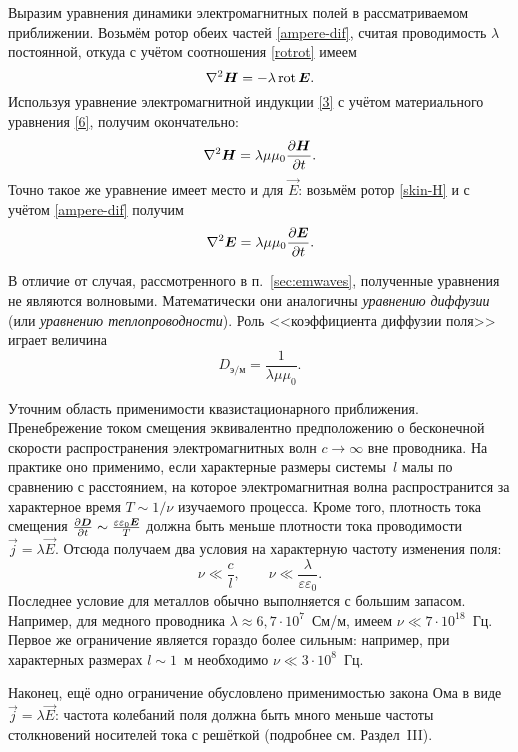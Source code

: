 Выразим уравнения динамики электромагнитных полей в рассматриваемом приближении.
Возьмём ротор обеих частей \eqref{ampere-dif}, считая проводимость $\lambda$ 
постоянной, откуда с учётом соотношения \eqref{rotrot} имеем
\begin{equation*} \eqmark{8}
\nabla^2\vec{H}= -\lambda \Rot \vec{E}.
\end{equation*}
Используя уравнение электромагнитной индукции \eqref{3} с учётом материального 
уравнения \eqref{6}, получим окончательно:
\begin{equation}\eqmark{skin-H}
\nabla^2\vec{H}= \lambda\mu\mu_0 \ddt{\vec{H}}.
\end{equation}
Точно такое же уравнение имеет место и для $\vec{E}$:
возьмём ротор \eqref{skin-H} и с учётом \eqref{ampere-dif} получим
\begin{equation}\eqmark{skin-E}
\nabla^2\vec{E}= \lambda\mu\mu_0 \ddt{\vec{E}}.
\end{equation}

В отличие от случая, рассмотренного в п.~\ref{sec:emwaves}, 
полученные уравнения не являются волновыми. Математически они аналогичны
\emph{уравнению диффузии} (или \emph{уравнению теплопроводности}). Роль 
<<коэффициента диффузии поля>> играет величина
\begin{equation}
D_{э/м} = \frac{1}{\lambda \mu \mu_0}.
\end{equation}

\begin{lab:note}
    Уточним область применимости квазистационарного приближения.
    Пренебрежение током смещения эквивалентно предположению о бесконечной скорости 
    распространения электромагнитных волн $c\to \infty$ вне проводника. 
    На практике оно применимо, если характерные размеры системы~$l$ малы по
    сравнению с расстоянием, на которое электромагнитная волна распространится
    за характерное время $T\sim 1/\nu$ изучаемого процесса.
    Кроме того, плотность тока смещения 
    $\frac{\partial {\boldsymbol{D}}}{\partial t} \sim \frac{\varepsilon\varepsilon_0 {\boldsymbol{E}}}{T}$ 
    должна быть меньше плотности тока проводимости $\vec{j}=\lambda\vec{E}$.
    Отсюда получаем два условия на характерную частоту изменения поля:
    \[
    \nu \ll \frac{c}{l},\qquad \nu \ll \frac{\lambda}{\varepsilon\varepsilon_0}.
    \]
    Последнее условие для металлов обычно выполняется с большим запасом. 
    Например, для медного проводника $\lambda \approx 6,7\cdot 10^7$~См/м,
    имеем $\nu \ll 7\cdot 10^{18}$~Гц. Первое же ограничение является гораздо 
    более сильным: например, при характерных размерах $l\sim 1$~м необходимо
    $\nu \ll 3 \cdot 10^8$~Гц.
    
    Наконец, ещё одно ограничение обусловлено применимостью закона Ома в виде
    $\vec{j}=\lambda \vec{E}$: частота колебаний поля должна быть много меньше 
    частоты столкновений носителей тока с решёткой
    (подробнее см. Раздел~III).
\end{lab:note}

